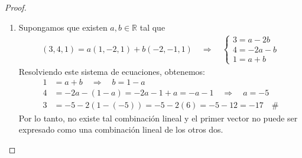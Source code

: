 \documentclass[11pt,letterpaper]{article}
\newcommand{\R}{\mathbb{R}}
\begin{document}
\begin{proof}
\begin{enumerate}
    \item Supongamos que existen $a,b\in \R$ tal que
    \begin{align*}
        (3,4,1)=a(1,-2,1)+b(-2,-1,1) \quad \Rightarrow \quad
        \begin{cases}
            3=a-2b \\
            4=-2a-b \\
            1=a+b
        \end{cases}
    \end{align*}
    Resolviendo este sistema de ecuaciones, obtenemos:
    \begin{align*}
        1 &= a + b \quad \Rightarrow \quad b = 1 - a \\
        4 &= -2a - (1 - a) = -2a - 1 + a = -a - 1 \quad \Rightarrow \quad a = -5 \\
        3 &= -5 - 2(1 - (-5)) = -5 - 2(6) = -5 - 12 = -17 \quad \#
    \end{align*}
    Por lo tanto, no existe tal combinación lineal y el primer vector no puede ser expresado como una combinación lineal de los otros dos.
    \end{enumerate}
\end{proof}\,\\
\end{document}
